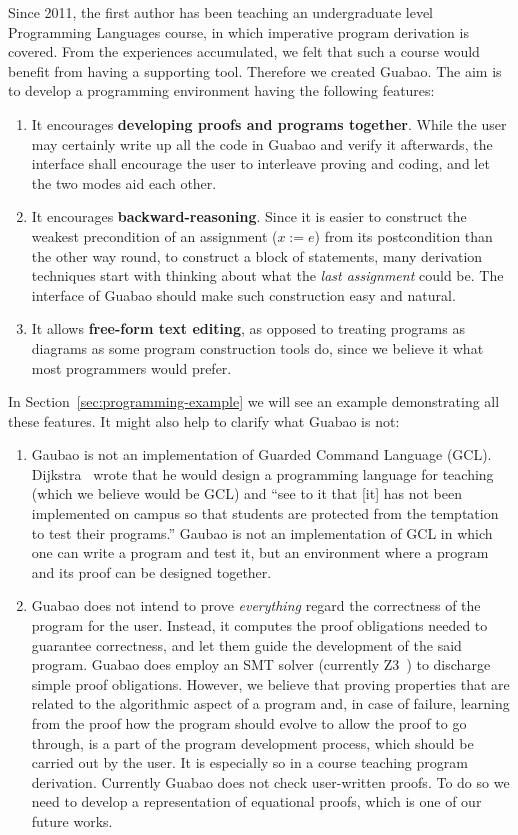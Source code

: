 \documentclass[runningheads]{llncs}
\newcommand{\Varid}[1]{\mathit{#1}}
\let\Varid\mathit
\begin{document}
Since 2011, the first author has been teaching an undergraduate level Programming Languages course, in which imperative program derivation is covered.
From the experiences accumulated, we felt that such a course would benefit from having a supporting tool.
Therefore we created Guabao.
The aim is to develop a programming environment having the following features:
\begin{enumerate}
\item It encourages {\bf developing proofs and programs together}.
While the user may certainly write up all the code in Guabao and verify it afterwards, the interface shall encourage the user to interleave proving and coding, and let the two modes aid each other.
\item It encourages {\bf backward-reasoning}.
Since it is easier to construct the weakest precondition of an assignment (\ensuremath{\Varid{x}\mathbin{:=}\Varid{e}}) from its postcondition than the other way round,
to construct a block of statements, many derivation techniques start with thinking about what the \emph{last assignment} could be.
The interface of Guabao should make such construction easy and natural.
\item It allows {\bf free-form text editing}, as opposed to treating programs as diagrams as some program construction tools do, since we believe it what most programmers would prefer.
\end{enumerate}
In Section~\ref{sec:programming-example} we will see an example demonstrating all these features.
It might also help to clarify what Guabao is not:
\begin{enumerate}
\item Gaubao is not an implementation of Guarded Command Language (GCL).
Dijkstra~\cite{Dijkstra:98:Cruelty} wrote that he would
design a programming language for teaching (which we believe would be GCL) and ``see to it that [it] has not been implemented on campus so that students are protected from the temptation to test their programs.''
Gaubao is not an implementation of GCL in which one can write a program and test it, but an environment where a program and its proof can be designed together.
\item Guabao does not intend to prove \emph{everything} regard the correctness of the program for the user.
Instead, it computes the proof obligations needed to guarantee correctness, and let them guide the development of the said program.
Guabao does employ an SMT solver (currently Z3~\cite{MS:12:Z3}) to discharge simple proof obligations.
However, we believe that proving properties that are related to the algorithmic aspect of a program and, in case of failure, learning from the proof how the program should evolve to allow the proof to go through, is a part of the program development process, which should be carried out by the user.
It is especially so in a course teaching program derivation.
Currently Guabao does not check user-written proofs.
To do so we need to develop a representation of equational proofs, which is one of our future works.
\end{enumerate}
\end{document}
